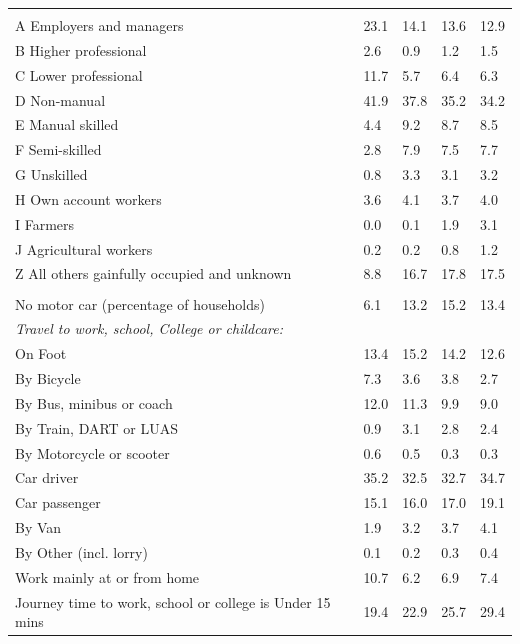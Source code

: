 \documentclass{article}
\begin{document}
\begin{table}[h]
\begin{tabular}{KTTTT}
\hline
    \\ 
    \hline
A Employers and managers & 23.1& 14.1& 13.6& 12.9\\
B Higher professional & 2.6& 0.9& 1.2& 1.5\\
C Lower professional & 11.7&  5.7&  6.4&  6.3\\
D Non-manual & 41.9& 37.8& 35.2& 34.2\\
E Manual skilled & 4.4& 9.2& 8.7& 8.5\\
F Semi-skilled & 2.8& 7.9& 7.5& 7.7\\
G Unskilled & 0.8& 3.3& 3.1& 3.2\\
H Own account workers & 3.6& 4.1& 3.7& 4.0\\
I Farmers & 0.0& 0.1& 1.9& 3.1\\
J Agricultural workers & 0.2& 0.2& 0.8& 1.2\\
Z All others gainfully occupied and unknown &  8.8& 16.7& 17.8& 17.5\\
\hline
{}\hline
    \\ 
    \hline
No motor car (percentage of households) &  6.1& 13.2& 15.2& 
13.4\\
    \hline 
\emph{Travel to work, school, College or childcare:} & & & \\
\quad On Foot & 13.4& 15.2& 14.2& 12.6\\ 
\quad By Bicycle & 7.3& 3.6& 3.8& 2.7\\ 
\quad By Bus, minibus or coach & 12.0& 11.3&  9.9&  9.0\\
\quad By Train, DART or LUAS & 0.9& 3.1& 2.8& 2.4\\
\quad By Motorcycle or scooter & 0.6& 0.5& 0.3& 0.3\\
\quad Car driver & 35.2 & 32.5& 32.7& 34.7\\
\quad Car passenger & 15.1& 16.0& 17.0& 19.1\\
\quad By Van & 1.9& 3.2& 3.7& 4.1\\
\quad By Other (incl. lorry) & 0.1& 0.2& 0.3& 0.4\\
    \hline
Work mainly at or from home & 10.7&  6.2&  6.9&  7.4\\
Journey time to work, school or college is Under 15 mins & 19.4& 22.9& 25.7& 29.4\\

\end{tabular}
\end{table}
\end{document}
